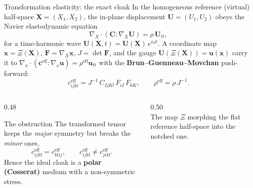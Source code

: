 \documentclass[aspectratio=169, 10pt]{beamer}
\newcommand{\mbf}[1]{\mathbf{#1}}
\newcommand{\Ceff}{\mbf{c}^{\mathrm{eff}}}
\begin{document}
\begin{frame}{Transformation elasticity: the exact cloak}
  \setlength{\abovedisplayskip}{4pt}\setlength{\belowdisplayskip}{4pt}
  \setlength{\abovedisplayshortskip}{2pt}\setlength{\belowdisplayshortskip}{2pt}
  \small
  In the homogeneous reference (virtual) half-space $\mbf{X}=(X_1,X_2)$, the
  in-plane displacement $\mbf{U}=(U_1,U_2)$ obeys the Navier elastodynamic
  equation
  \begin{equation*}
    \nabla_{\!X}\cdot\left(\mbf{C}:\nabla_{\!X}\mbf{U}\right)=\rho\,\mbf{U}_{tt},
  \end{equation*}
  for a time-harmonic wave $\mbf{U}(\mbf{X},t)=\mbf{U}(\mbf{X})\,e^{i\omega t}$. 
  A coordinate map $\mbf{x}=\Xi(\mbf{X})$, $\mbf{F}=\nabla_{\!X}\mbf{x}$,
  $J=\det\mbf{F}$, and the gauge $\mbf{U}(\Xi(\mbf{X}))=\mbf{u}(\mbf{x})$ carry it
  to
  $\nabla_{\!x}\!\cdot(\Ceff:\nabla_{\!x}\mbf{u})=\rho^{\mathrm{eff}}\mbf{u}_{tt}$
  with the \textbf{Brun--Guenneau--Movchan} push-forward:
  \begin{equation*}
    c^{\mathrm{eff}}_{ijkl}=J^{-1}\,C_{IjKl}\,F_{iI}\,F_{kK},
    \qquad \rho^{\mathrm{eff}}=\rho\,J^{-1}.
  \end{equation*}
  \begin{columns}[T]
    \begin{column}{0.48\textwidth}
      \begin{block}{The obstruction}
        \small The transformed tensor keeps the \emph{major} symmetry but
        breaks the \emph{minor} ones,
        \[
          c^{\mathrm{eff}}_{ijkl}=c^{\mathrm{eff}}_{klij},
          \qquad
          c^{\mathrm{eff}}_{ijkl}\neq c^{\mathrm{eff}}_{jikl}.
        \]
        Hence the ideal cloak is a \textbf{polar (Cosserat)} medium with a
        non-symmetric stress.
      \end{block}
    \end{column}
    \begin{column}{0.50\textwidth}
      \centering
      \\[0.2em]
      {\scriptsize The map $\Xi$ morphing the flat reference half-space
        into the notched one.}
    \end{column}
  \end{columns}
\end{frame}
\end{document}
